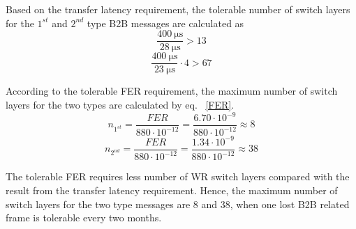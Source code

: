 Based on the transfer latency requirement, the tolerable number of switch layers for the $1^\mathit{st}$ and $2^\mathit{nd}$ type B2B messages are calculated as
\begin{equation}
		\frac{\SI{400}{\us}}{\SI{28}{\us}}>13
\end{equation}
\begin{equation}
		\frac{\SI{400}{\us}}{\SI{23}{\us}}\cdot 4 > 67
\end{equation}

According to the tolerable FER requirement, the maximum number of switch layers for the two types are calculated by eq. ~\ref{FER}.  
\begin{equation}
n_{1^{st}}=\frac{FER}{880\cdot10^{-12}}=\frac{6.70\cdot 10^{-9}}{880\cdot10^{-12}}\approx 8
\end{equation}
\begin{equation}
n_{2^{nd}}=\frac{FER}{880\cdot10^{-12}}=\frac{1.34\cdot 10^{-9}}{880\cdot10^{-12}}\approx 38
\end{equation}

The tolerable FER requires less number of WR switch layers compared with the result from the transfer latency requirement. Hence, the maximum number of switch layers for the two type messages are 8 and 38, when one lost B2B related frame is tolerable every two months. 

